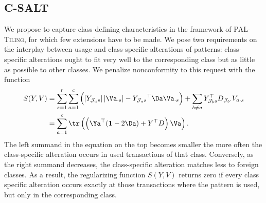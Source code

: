 \subsection{C-SALT}\label{sec:CS:CSalt}
We propose to capture class-defining characteristics in the framework of \textsc{PAL-Tiling}, for which few extensions have to be made.
We pose two requirements on the interplay between usage and class-specific alterations of patterns: class-specific alterations ought to fit very well to the corresponding class but as little as possible to other classes.
We  penalize nonconformity to this request with the function
\begin{align*}
S(Y,V) &= \sum_{s=1}^r\sum_{a=1}^c \left(\left\lvert Y_{\mathcal{J}_a s}\right\rvert \left\lvert \Va_{\cdot s}\right\rvert -{Y_{\mathcal{J}_a s}}^\top \Da \Va_{\cdot s}\right)+\sum_{b\neq a}{Y}_{\mathcal{J}_b s}^\top D_{\mathcal{J}_b\cdot}V_{a\cdot s}\\
&=\sum_{a=1}^c\tr\left(\left({\Ya}^\top (\mathbf{1}-2\Da) + Y^\top D\right)\Va\right).
\end{align*}
The left summand in the equation on the top becomes smaller the more often the class-specific alteration occurs in used transactions of that class. Conversely, as the right summand decreases, the class-specific alteration matches less to foreign classes. As a result, the regularizing function $S(Y,V)$ returns zero if every class specific alteration occurs exactly at those transactions where the pattern is used, but only in the corresponding class. 

